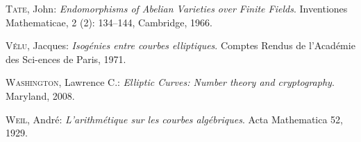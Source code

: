 \documentclass[12pt]{report}
\begin{document}
\begin{thebibliography}{97}
\textsc{Tate}, John: \textit{Endomorphisms of Abelian Varieties over Finite Fields}. Inventiones Mathematicae, 2 (2): 134–144, Cambridge, 1966.

\textsc{Vélu}, Jacques: \textit{Isogénies entre courbes elliptiques}. Comptes Rendus de l’Académie des Sci-ences de Paris, 1971. 

\textsc{Washington}, Lawrence C.: \textit{Elliptic Curves: Number theory and cryptography}. Maryland, 2008. 

\textsc{Weil}, André: \textit{L'arithmétique sur les courbes algébriques}.  Acta Mathematica 52, 1929. 


\end{thebibliography}
\end{document}
